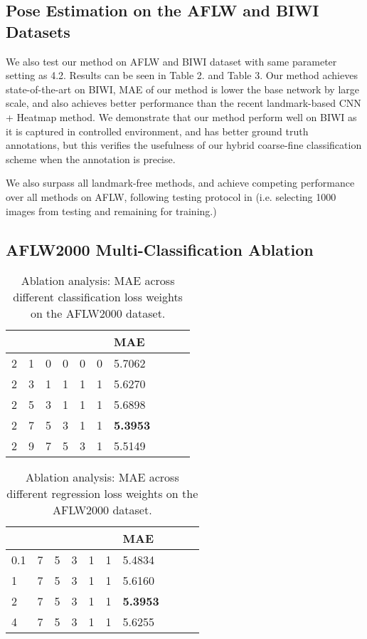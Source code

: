\documentclass{article}
\begin{document}
\begin{CJK*}{UTF8}{gkai}
\subsection{Pose Estimation on the AFLW and BIWI Datasets}
\label{sssec:subsubhead}
We also test our method on AFLW and BIWI dataset with same parameter setting as 4.2. Results can be seen in Table 2. and Table 3. Our method achieves state-of-the-art on BIWI, MAE of our method is lower the base network \cite{ruiz2017fine} by large scale, and also achieves better performance than the recent landmark-based CNN + Heatmap \cite{gupta2018nose} method. We demonstrate that our method perform well on BIWI as it is captured in controlled environment, and has better ground truth annotations, but this verifies the usefulness of our hybrid  coarse-fine classification scheme when the annotation is precise.

We also surpass all landmark-free methods, and achieve competing performance over all methods on AFLW, following testing protocol in \cite{kumar2017kepler} (i.e. selecting 1000 images from testing and remaining for training.)


\subsection{AFLW2000 Multi-Classification Ablation}
\label{sssec:subsubhead}

\begin{table}[htbp]
\centering 
\begin{tabular}{llllllllll}
\hline  \hline 
  &  &  &  &  &  & MAE    \\
\hline 
2 & 1 & 0 & 0 & 0 & 0 & 5.7062 \\
\hline 
2 & 3 & 1 & 1 & 1 & 1  & 5.6270 \\
\hline 
2 & 5 & 3 & 1 & 1 & 1 & 5.6898 \\
\hline 
2 & 7 & 5 & 3 & 1 & 1  & \textbf{5.3953} \\
\hline 
2 & 9 & 7 & 5 & 3 & 1 & 5.5149 \\
\hline \hline
\end{tabular}
\caption{Ablation analysis: MAE across different classification loss weights on the AFLW2000 dataset.}
\end{table}

\begin{table}[htbp]
\centering 
\begin{tabular}{llllllllll}
\hline \hline
   &  &  &  &  &  &  MAE    \\
\hline
0.1 & 7 & 5 & 3 & 1 & 1 &  5.4834 \\
\hline
1   & 7 & 5 & 3 & 1 & 1 &  5.6160 \\
\hline
2   & 7 & 5 & 3 & 1 & 1 &  \textbf{5.3953} \\
\hline
4   & 7 & 5 & 3 & 1 & 1 &  5.6255 \\
\hline \hline
\end{tabular}
\caption{Ablation analysis: MAE across different regression loss weights on the AFLW2000 dataset.}
\end{table}


\end{CJK*}
\end{document}
